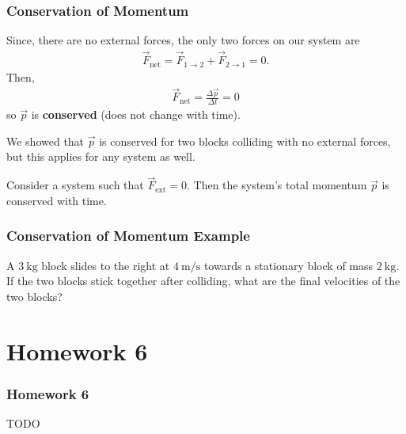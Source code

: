 \documentclass[20pt]{beamer}
\begin{document}
\begin{frame}
	\frametitle{Conservation of Momentum}
	\begin{example}[cont.]
		Since, there are no external forces, the only two forces on our system are
		\begin{align*}
			\vec{F}_\mathrm{net} = \vec{F}_{1 \rightarrow 2} + \vec{F}_{2 \rightarrow 1} = 0.
		\end{align*}
		Then,
		\begin{align*}
			\vec{F}_\mathrm{net} = \frac{\Delta \vec{p}}{\Delta t} = 0
		\end{align*}
		so $\vec{p}$ is \textbf{conserved} (does not change with time).
	\end{example}
	We showed that $\vec{p}$ is conserved for two blocks colliding with no external forces, but this applies for any system as well.
	\begin{theorem}
		Consider a system such that $\vec{F}_\mathrm{ext} = 0$. Then the system's total momentum $\vec{p}$ is conserved with time.
	\end{theorem}
\end{frame}

\begin{frame}
	\frametitle{Conservation of Momentum Example}
	\begin{example}
		A $\SI{3}{\kilogram}$ block slides to the right at $\SI{4}{\meter/\second}$ towards a stationary block of mass $\SI{2}{\kilogram}$.
		If the two blocks stick together after colliding, what are the final velocities of the two blocks?
	\end{example}
\end{frame}

\section{Homework 6}

\begin{frame}
	\frametitle{Homework 6}
	TODO
\end{frame}
\end{document}
